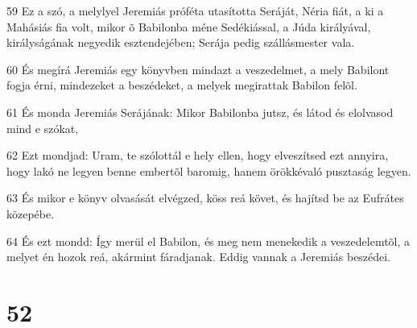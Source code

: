 \par 59 Ez a szó, a melylyel Jeremiás próféta utasította Seráját, Néria fiát, a ki a Mahásiás fia volt, mikor õ Babilonba méne Sedékiással, a Júda királyával, királyságának negyedik esztendejében; Serája pedig szállásmester vala.
\par 60 És megírá Jeremiás egy könyvben mindazt a veszedelmet, a mely Babilont fogja érni, mindezeket a beszédeket, a melyek megirattak Babilon felõl.
\par 61 És monda Jeremiás Serájának: Mikor Babilonba jutsz, és látod és elolvasod mind e szókat,
\par 62 Ezt mondjad: Uram, te szólottál e hely ellen, hogy elveszítsed ezt annyira, hogy lakó ne legyen benne embertõl baromig, hanem örökkévaló pusztaság legyen.
\par 63 És mikor e könyv olvasását elvégzed, köss reá követ, és hajítsd be az Eufrátes közepébe.
\par 64 És ezt mondd: Így merül el Babilon, és meg nem menekedik a veszedelemtõl, a melyet én hozok reá, akármint fáradjanak. Eddig vannak a Jeremiás beszédei.

\chapter{52}

